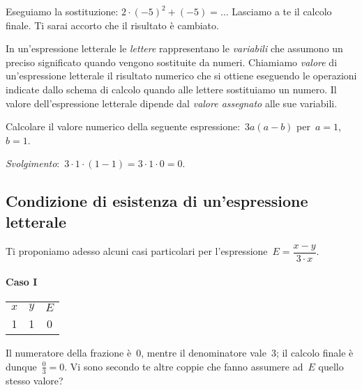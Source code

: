 Eseguiamo la sostituzione:  $2\cdot (-5)^{2}+(-5)=\ldots$ Lasciamo a te il 
calcolo finale. Ti sarai accorto che il risultato è cambiato.

 \begin{definizione}
In un'espressione letterale le \emph{lettere} rappresentano 
le \emph{variabili} che assumono un preciso significato quando vengono 
sostituite da numeri.
Chiamiamo \emph{valore} di un'espressione letterale il risultato numerico 
che si ottiene eseguendo le operazioni indicate dallo
schema di calcolo quando alle lettere sostituiamo un numero. 
Il valore dell'espressione letterale dipende dal \emph{valore assegnato} 
alle sue variabili.
\end{definizione}

\begin{exrig}
 \begin{esempio}
Calcolare il valore numerico della seguente 
espressione:~$3a(a-b)$ per~$a =1$, $b =1$.

\emph{Svolgimento}:~$3\cdot 1\cdot (1-1)=3\cdot 1\cdot 0=0$.
\end{esempio}
 \end{exrig}


\subsection{Condizione di esistenza di un'espressione letterale}
\label{subsec:condes}

Ti proponiamo adesso alcuni casi particolari per
l'espressione~$E=\dfrac{x-y}{3\cdot x}$.

\paragraph{Caso I}

\begin{center}
\begin{tabular*}{.2\textwidth}{@{\extracolsep{\fill}}*{3}{c}}
\toprule
$x$ & $y$ & $E$\\
1 & 1 & 0\\
\bottomrule
\end{tabular*}
\end{center}

Il numeratore della frazione è~0, mentre il denominatore vale~3; il
calcolo finale è dunque~$\frac{0}{3}=0$.
Vi sono secondo te altre coppie che fanno
assumere ad~$E$ quello stesso valore?


